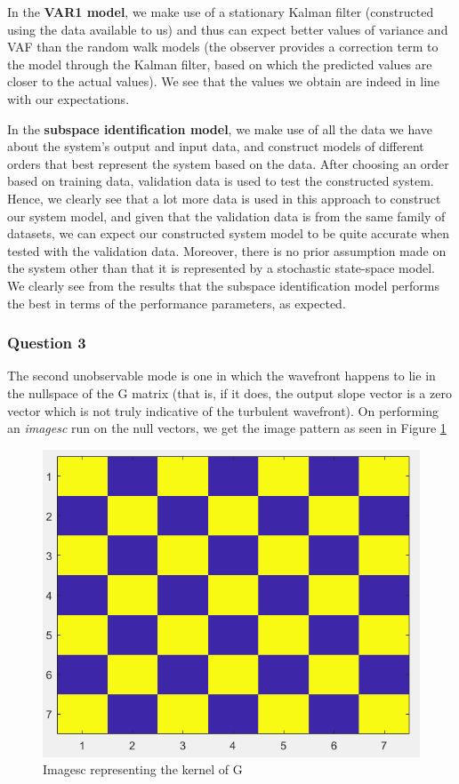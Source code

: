 \documentclass[12pt]{report}
\begin{document}
In the \textbf{VAR1 model}, we make use of a stationary Kalman filter (constructed using the data available to us) and thus can expect better values of variance and VAF than the random walk models (the observer provides a correction term to the model through the Kalman filter, based on which the predicted values are closer to the actual values). We see that the values we obtain are indeed in line with our expectations.

In the \textbf{subspace identification model}, we make use of all the data we have about the system's output and input data, and construct models of different orders that  best represent the system based on the data. After choosing an order based on training data, validation data is used to test the constructed system. Hence, we clearly see that a lot more data is used in this approach to construct our system model, and given that the validation data is from the same family of datasets, we can expect our constructed system model to be quite accurate when tested with the validation data. Moreover, there is no prior assumption made on the system other than that it is represented by a stochastic state-space model. We clearly see from the results that the subspace identification model performs the best in terms of the performance parameters, as expected.

\subsubsection*{Question 3}

The second unobservable mode is one in which the wavefront happens to lie in the nullspace of the G matrix (that is, if it does, the output slope vector is a zero vector which is not truly indicative of the turbulent wavefront). On performing an \textit{imagesc} run on the null vectors, we get the image pattern as seen in Figure \ref{fig:gnullspacevectors}

\begin{figure}[!h]
	\centering
	\includegraphics[width=0.7\linewidth]{G_nullSpaceVectors}
	\caption{Imagesc representing the kernel of G}
	\label{fig:gnullspacevectors}
\end{figure}
\end{document}
